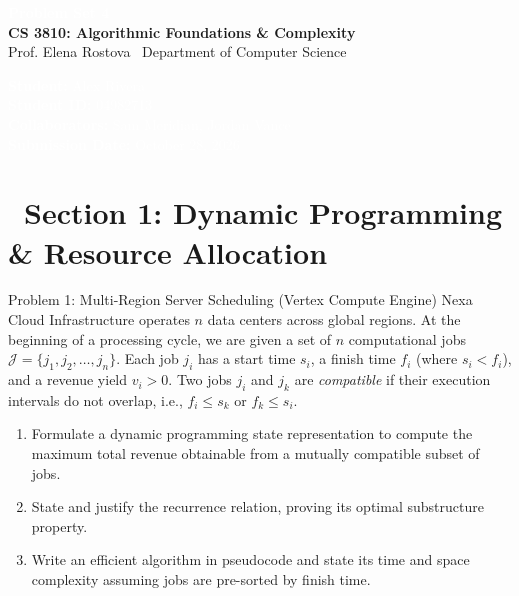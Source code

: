 \documentclass[11pt, a4paper]{article}
\begin{document}
\begin{headerbox}
  \sffamily
  \begin{minipage}[c]{0.58\textwidth}
    {\Huge \bfseries \textcolor{white}{Problem Set 4}} \\[2pt]
    {\large \textcolor{accent}{\textbf{CS 3810: Algorithmic Foundations \& Complexity}}} \\[2pt]
    {\small \textcolor{gray!30}{Prof. Elena Rostova \textbullet\ Department of Computer Science}}
  \end{minipage}%
  \hfill
  \begin{minipage}[c]{0.38\textwidth}
    \raggedleft \small \textcolor{white}{
      \textbf{Student:} Alex Rivera \\
      \textbf{Student ID:} 04982713 \\
      \textbf{Collaborators:} Sam Meridian, Jordan Vance \\
      \textbf{Submission Date:} October 28, 2026
    }
  \end{minipage}
\end{headerbox}

\vspace{2pt}

\section*{\sffamily\textcolor{primary}{\faCode\ Section 1: Dynamic Programming \& Resource Allocation}}

\begin{problembox}{Problem 1: Multi-Region Server Scheduling (Vertex Compute Engine)}
  Nexa Cloud Infrastructure operates $n$ data centers across global regions. At the beginning of a processing cycle, we are given a set of $n$ computational jobs $\mathcal{J} = \{j_1, j_2, \dots, j_n\}$. Each job $j_i$ has a start time $s_i$, a finish time $f_i$ (where $s_i < f_i$), and a revenue yield $v_i > 0$. Two jobs $j_i$ and $j_k$ are \emph{compatible} if their execution intervals do not overlap, i.e., $f_i \le s_k$ or $f_k \le s_i$.

  \begin{enumerate}[label=\textbf{(\alph*)}, leftmargin=1.5em, itemsep=0.5pt]
    \item Formulate a dynamic programming state representation to compute the maximum total revenue obtainable from a mutually compatible subset of jobs.
    \item State and justify the recurrence relation, proving its optimal substructure property.
    \item Write an efficient algorithm in pseudocode and state its time and space complexity assuming jobs are pre-sorted by finish time.
  \end{enumerate}
\end{problembox}
\end{document}
